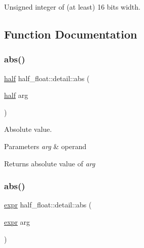 Unsigned integer of (at least) 16 bits width. 



\subsection{Function Documentation}
\mbox{\label{namespacehalf__float_1_1detail_a25d76d0f9f18298a1096716c0da7b6e5}} 
\subsubsection{\texorpdfstring{abs()}{abs()}\hspace{0.1cm}{\footnotesize\ttfamily [1/2]}}
{\footnotesize\ttfamily \hyperlink{classhalf__float_1_1half}{half} half\+\_\+float\+::detail\+::abs (\begin{DoxyParamCaption}\item[{\hyperlink{classhalf__float_1_1half}{half}}]{arg }\end{DoxyParamCaption})\hspace{0.3cm}{\ttfamily [inline]}}

Absolute value. 
\begin{DoxyParams}{Parameters}
{\em arg} & operand \\
\hline
\end{DoxyParams}
\begin{DoxyReturn}{Returns}
absolute value of {\itshape arg} 
\end{DoxyReturn}
\mbox{\label{namespacehalf__float_1_1detail_a7453dfce91b2c6b4ce6688f452ff8d64}} 
\subsubsection{\texorpdfstring{abs()}{abs()}\hspace{0.1cm}{\footnotesize\ttfamily [2/2]}}
{\footnotesize\ttfamily \hyperlink{structhalf__float_1_1detail_1_1expr}{expr} half\+\_\+float\+::detail\+::abs (\begin{DoxyParamCaption}\item[{\hyperlink{structhalf__float_1_1detail_1_1expr}{expr}}]{arg }\end{DoxyParamCaption})\hspace{0.3cm}{\ttfamily [inline]}}

